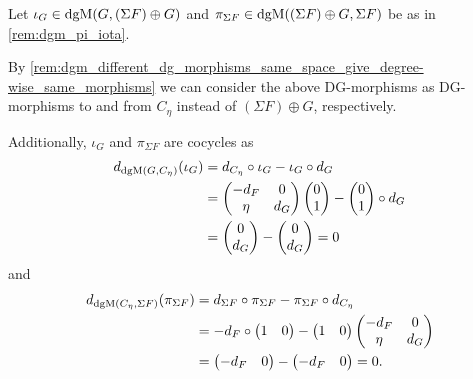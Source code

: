 \begin{remark}
    \label{rem:dgm_differentials_of_inclusions_and_projections_of_cone}
    Let \( \iota_G \in \operatorname{dgM}(G, (\Sigma F) \oplus G) \) and \( \pi_{\Sigma F} \in \operatorname{dgM}((\Sigma F) \oplus G, \Sigma F) \) be as in \autoref{rem:dgm_pi_iota}.

    By \autoref{rem:dgm_different_dg_morphisms_same_space_give_degree-wise_same_morphisms} we can consider the above DG-morphisms as DG-morphisms to and from \( C_{\eta} \) instead of \( (\Sigma F) \oplus G \), respectively.

    Additionally, \( \iota_G \) and \( \pi_{\Sigma F} \) are cocycles as
    \begin{align*}
        d_{\operatorname{dgM}(G, C_{\eta})}(\iota_G) &= d_{C_{\eta}} \circ \iota_G - \iota_G \circ d_G \\
        &=
        \begin{pmatrix}
            -d_F & 0 \\
            \eta & d_G
        \end{pmatrix}
        \begin{pmatrix}
            0 \\
            1
        \end{pmatrix}
        -
        \begin{pmatrix}
            0 \\
            1
        \end{pmatrix}
        \circ d_G \\
        &=
        \begin{pmatrix}
            0 \\
            d_G
        \end{pmatrix}
        -
        \begin{pmatrix}
            0 \\
            d_G
        \end{pmatrix}
        = 0
    \end{align*}
    and
    \begin{align*}
        d_{\operatorname{dgM}(C_{\eta}, \Sigma F)}(\pi_{\Sigma F}) &= d_{\Sigma F} \circ \pi_{\Sigma F} - \pi_{\Sigma F} \circ d_{C_{\eta}} \\
        &= -d_F \circ
        \begin{pmatrix}
            1 & 0
        \end{pmatrix}
        -
        \begin{pmatrix}
            1 & 0
        \end{pmatrix}
        \begin{pmatrix}
            -d_F & 0 \\
            \eta & d_G
        \end{pmatrix} \\
        &=
        \begin{pmatrix}
            -d_F & 0
        \end{pmatrix}
        -
        \begin{pmatrix}
            -d_F & 0
        \end{pmatrix}
        = 0.
    \end{align*}


\end{remark}
